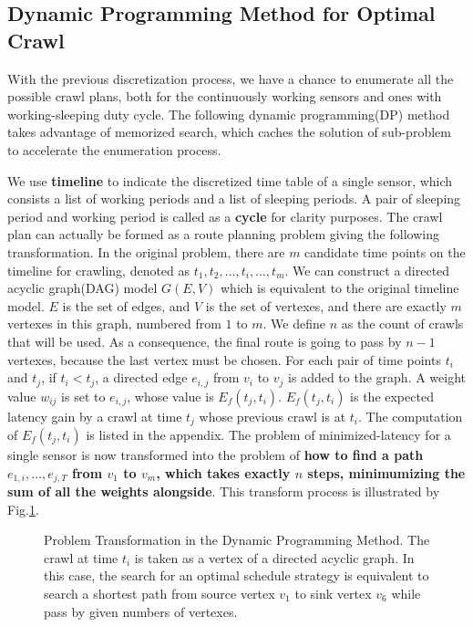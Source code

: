 \documentclass[conference]{IEEEtran}
\begin{document}
\subsection{Dynamic Programming Method for Optimal Crawl}

With the previous discretization process, we have a chance to enumerate all the possible crawl plans, both for the continuously working sensors and ones with working-sleeping duty cycle. 
The following dynamic programming(DP) method takes advantage of memorized search, which caches the solution of sub-problem to accelerate the enumeration process.

We use \textbf{timeline} to indicate the discretized time table of a single sensor, which consists a list of working periods and a list of sleeping periods.
A pair of sleeping period and working period is called as a \textbf{cycle} for clarity purposes.
The crawl plan can actually be formed as a route planning problem giving the following transformation.
In the original problem, there are $m$ candidate time points on the timeline for crawling, denoted as $t_1, t_2, \hdots, t_i, \hdots, t_m$.
We can construct a directed acyclic graph(DAG) model $G(E,V)$ which is equivalent to the original timeline model.
$E$ is the set of edges, and $V$ is the set of vertexes, and there are exactly $m$ vertexes in this graph, numbered from $1$ to $m$. 
We define $n$ as the count of crawls that will be used.
As a consequence, the final route is going to pass by $n-1$ vertexes, because the last vertex must be chosen. 
For each pair of time points $t_i$ and $t_j$, if $t_i<t_j$, a directed edge $e_{i,j}$ from $v_i$ to $v_j$ is added to the graph. 
A weight value $w_{ij}$ is set to $e_{i,j}$, whose value is $E_f(t_j, t_i)$.
$E_f(t_j, t_i)$ is the expected latency gain by a crawl at time $t_j$ whose previous crawl is at $t_i$.
The computation of $E_f(t_j, t_i)$ is listed in the appendix.
The problem of minimized-latency for a single sensor is now transformed into the problem of \textbf{how to find a path $e_{1,i},\ldots,e_{j,T}$ from $v_1$ to $v_m$, which takes exactly $n$ steps, minimumizing the sum of all the weights alongside}.
This transform process is illustrated by Fig.\ref{fig:problemtrans}.
\begin{figure}
	\centering
	
	\captionsetup{justification=centering}
	\captionsetup{justification=justified, singlelinecheck=false}
	\caption{Problem Transformation in the Dynamic Programming Method. The crawl at time $t_i$ is taken as a vertex of a directed acyclic graph. In this case, the search for an optimal schedule strategy is equivalent to search a shortest path from source vertex $v_1$ to sink vertex $v_6$ while pass by given numbers of vertexes.}
	\vspace{-0.5em}
	\label{fig:problemtrans}
\end{figure}
\end{document}
